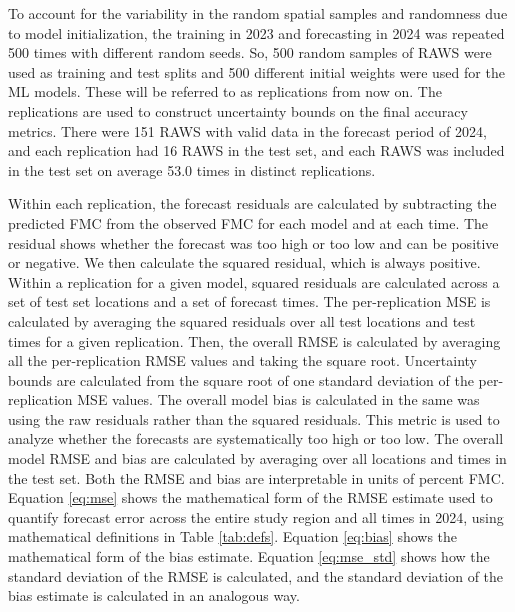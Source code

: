 \documentclass[fire,article,submit,pdftex,moreauthors]{Definitions/mdpi}
\begin{document}
To account for the variability in the random spatial samples and randomness due to model initialization, the training in 2023 and forecasting in 2024 was repeated 500 times with different random seeds. So, 500 random samples of RAWS were used as training and test splits and 500 different initial weights were used for the ML models. These will be referred to as replications from now on. The replications are used to construct uncertainty bounds on the final accuracy metrics. There were 151 RAWS with valid data in the forecast period of 2024, and each replication had 16 RAWS in the test set, and each RAWS was included in the test set on average 53.0 times in distinct replications.

Within each replication, the forecast residuals are calculated by subtracting the predicted FMC from the observed FMC for each model and at each time. The residual shows whether the forecast was too high or too low and can be positive or negative. We then calculate the squared residual, which is always positive. Within a replication for a given model, squared residuals are calculated across a set of test set locations and a set of forecast times. The per-replication MSE is calculated by averaging the squared residuals over all test locations and test times for a given replication. Then, the overall RMSE is calculated by averaging all the per-replication RMSE values and taking the square root. Uncertainty bounds are calculated from the square root of one standard deviation of the per-replication MSE values. The overall model bias is calculated in the same was using the raw residuals rather than the squared residuals. This metric is used to analyze whether the forecasts are systematically too high or too low. The overall model RMSE and bias are calculated by averaging over all locations and times in the test set. Both the RMSE and bias are interpretable in units of percent FMC. Equation \ref{eq:mse} shows the mathematical form of the RMSE estimate used to quantify forecast error across the entire study region and all times in 2024, using mathematical definitions in Table \ref{tab:defs}. Equation \ref{eq:bias} shows the mathematical form of the bias estimate. Equation \ref{eq:mse_std} shows how the standard deviation of the RMSE is calculated, and the standard deviation of the bias estimate is calculated in an analogous way.
\end{document}
